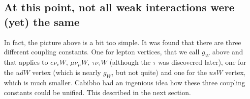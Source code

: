 \subsection{At this point, not all weak interactions were (yet) the same}
In fact, the picture above is a bit too simple. It was found that there are three different coupling constants. One for lepton vertices, that we call $g_W$ above and that applies to $e \nu_{e} W$, $\mu \nu_{\mu} W$, $\tau \nu_{\tau}W$ (although the $\tau$ was discovered later), one for the $ud W$ vertex (which is nearly $g_W$, but not quite) and one for the $usW$ vertex, which is much smaller.
Cabibbo had an ingenious idea how these three coupling constants could be unified. This described in the next section.
